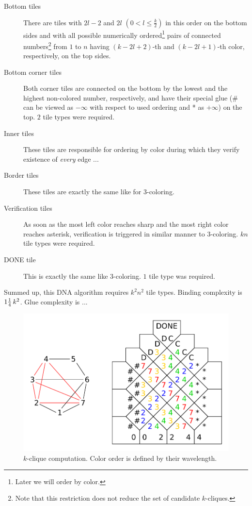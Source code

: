 \begin{description}
	\item[Bottom tiles] There are tiles with $2l-2$ and $2l$ $(0 < l \leq \frac{k}{2})$ in this order on the bottom sides and with all possible numerically ordered\footnote{Later we will order by color.} pairs of connected numbers\footnote{Note that this restriction does not reduce the set of candidate $k$-cliques.} from $1$ to $n$ having $(k-2l+2)$-th and $(k-2l+1)$-th color, respectively, on the top sides. %
	\item[Bottom corner tiles] Both corner tiles are connected on the bottom by the lowest and the highest non-colored number, respectively, and have their special glue (\# can be viewed as $-\infty$ with respect to used ordering and * as $+\infty$) on the top. $2$ tile types were required.
	\item[Inner tiles] These tiles are responsible for ordering by color during which they verify existence of {\em every} edge ...%
	\item[Border tiles] These tiles are exactly the same like for 3-coloring.
	\item[Verification tiles] As soon as the most left color reaches sharp and the most right color reaches asterisk, verification is triggered in similar manner to 3-coloring. $kn$ tile types were required.
	\item[DONE tile] This is exactly the same like 3-coloring. $1$ tile type was required.
\end{description}
Summed up, this DNA algorithm requires $k^2 n^2$ tile types. Binding complexity is $1\nicefrac{1}{4}\,k^2$. Glue complexity is ... %

\begin{figure}[H]
\begin{center}
	\includegraphics[scale=0.75]{./figures/k-clique/k-clique.pdf}
	\caption{$k$-clique computation. Color order is defined by their wavelength.}
	\label{fig:k-clique}
\end{center}
\end{figure}


